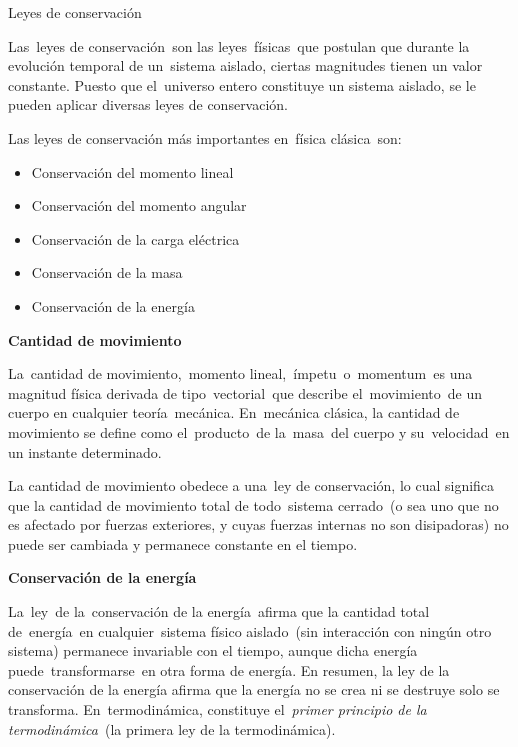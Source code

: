 \newpage %

\begin{myblock}{Leyes de conservación}
\begin{small}
Las leyes de conservación son las leyes físicas que postulan que durante la evolución temporal de un sistema aislado, ciertas magnitudes tienen un valor constante. Puesto que el universo entero constituye un sistema aislado, se le pueden aplicar diversas leyes de conservación.

Las leyes de conservación más importantes en física clásica son:
\begin{itemize}
\vspace{-2mm}\item Conservación del momento lineal
\vspace{-2mm} \item Conservación del momento angular
\vspace{-2mm}\item Conservación de la carga eléctrica
\vspace{-2mm}\item Conservación de la masa
\vspace{-2mm}\item Conservación de la energía
\end{itemize}

\textbf{Cantidad de movimiento}

La cantidad de movimiento, momento lineal, ímpetu o momentum es una magnitud física derivada de tipo vectorial que describe el movimiento de un cuerpo en cualquier teoría mecánica. En mecánica clásica, la cantidad de movimiento se define como el producto de la masa del cuerpo y su velocidad en un instante determinado. 

La cantidad de movimiento obedece a una ley de conservación, lo cual significa que la cantidad de movimiento total de todo sistema cerrado (o sea uno que no es afectado por fuerzas exteriores, y cuyas fuerzas internas no son disipadoras) no puede ser cambiada y permanece constante en el tiempo. 

\textbf{Conservación de la energía}

La ley de la conservación de la energía afirma que la cantidad total de energía en cualquier sistema físico aislado (sin interacción con ningún otro sistema) permanece invariable con el tiempo, aunque dicha energía puede transformarse en otra forma de energía. En resumen, la ley de la conservación de la energía afirma que la energía no se crea ni se destruye solo se transforma. En termodinámica, constituye el \emph{primer principio de la termodinámica} (la primera ley de la termodinámica).



\end{small}
\end{myblock}
